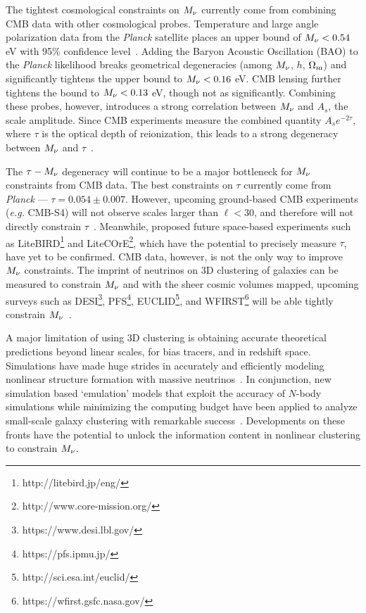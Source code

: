 The tightest cosmological constraints on $M_\nu$ currently come from 
combining CMB data with other cosmological probes. Temperature and large 
angle polarization data from the {\em Planck} satellite places an upper 
bound of $M_\nu < 0.54$ eV with 95\% confidence level~\citep{planckcollaboration2018}. 
Adding the Baryon Acoustic Oscillation (BAO) to the {\em Planck} 
likelihood breaks geometrical degeneracies (among $M_\nu$, $h$, $\Omega_{\rm m}$) 
and significantly tightens the upper bound to $M_\nu < 0.16$ eV. CMB 
lensing further tightens the bound to $M_\nu < 0.13$ eV, though 
not as significantly. Combining these probes, however, introduces a strong 
correlation between $M_\nu$ and $A_s$, the scale amplitude. Since CMB 
experiments measure the combined quantity $A_s e^{-2\tau}$, where 
$\tau$ is the optical depth of reionization, this leads to a strong 
degeneracy between $M_\nu$ and $\tau$~\citep{allison2015, liu2016, archidiacono2017}. 

The $\tau-M_\nu$ degeneracy will continue to be a major bottleneck 
for $M_\nu$ constraints from CMB data. The best constraints on $\tau$ 
currently come from {\em Planck} --- $\tau = 0.054\pm0.007$. However, upcoming 
ground-based CMB experiments ({\em e.g.} CMB-S4) will not observe scales 
larger than $\ell < 30$, and therefore will not directly constrain 
$\tau$~\citep{abazajian2016}.
Meanwhile, proposed future space-based 
experiments such as LiteBIRD\footnote{http://litebird.jp/eng/} and 
LiteCOrE\footnote{http://www.core-mission.org/}, which have the potential 
to precisely measure $\tau$, have yet to be confirmed. CMB data, however, 
is not the only way to improve $M_\nu$ constraints. The imprint of 
neutrinos on 3D clustering of galaxies can be measured to constrain 
$M_\nu$ and with the sheer cosmic volumes mapped, upcoming surveys such 
as DESI\footnote{https://www.desi.lbl.gov/}, PFS\footnote{https://pfs.ipmu.jp/}, 
EUCLID\footnote{http://sci.esa.int/euclid/}, and WFIRST\footnote{https://wfirst.gsfc.nasa.gov/} 
will be able tightly constrain 
$M_\nu$~\citep{audren2013, font-ribera2014, petracca2016, sartoris2016, boyle2018}.

A major limitation of using 3D clustering is obtaining accurate theoretical 
predictions beyond linear scales, for bias tracers, and in redshift space. 
Simulations have made huge strides in accurately and efficiently modeling 
nonlinear structure formation with massive neutrinos~\citep[\emph{e.g.}][]{brandbyge2008, 
villaescusa-navarro2013, castorina2015, adamek2017, emberson2017, villaescusa-navarro2018}. 
In conjunction, new simulation based `emulation' models that exploit the 
accuracy of $N$-body simulations while minimizing the computing budget 
have been applied to analyze small-scale galaxy clustering with remarkable 
success~\citep[\emph{e.g.}][]{heitmann2009, kwan2015, euclidcollaboration2018, mcclintock2018, zhai2018, wibking2019}. 
Developments on these fronts have the potential to unlock the information 
content in nonlinear clustering to constrain $M_\nu$. 

